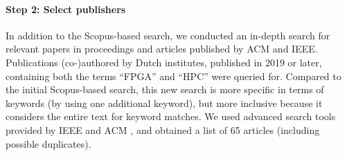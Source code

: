 

\paragraph{Step 2: Select publishers}
In addition to the Scopus-based search, we conducted an in-depth search for relevant papers in proceedings and articles published by ACM and IEEE. Publications (co-)authored by Dutch institutes, published in 2019 or later, containing both the terms ``FPGA'' and ``HPC'' %
were queried for.  
Compared to the initial Scopus-based search, this new search is more specific in terms of keywords (by using one additional keyword), but more inclusive because it considers the entire text for keyword matches. %
We used advanced search tools provided by IEEE and ACM \cite{acm_advanced_search} \cite{ieee_advanced_search}, and obtained a list of 65 articles (including possible duplicates). %

